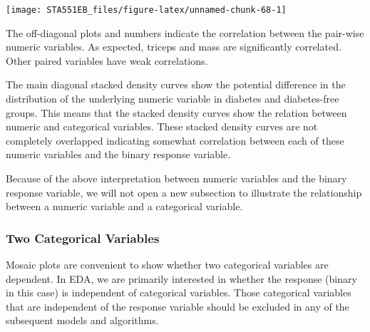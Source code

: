 \documentclass[
]{book}
\begin{document}
\begin{center}\texttt{[image: STA551EB\_files/figure-latex/unnamed-chunk-68-1]} \end{center}

The off-diagonal plots and numbers indicate the correlation between the pair-wise numeric variables. As expected, triceps and mass are significantly correlated. Other paired variables have weak correlations.

The main diagonal stacked density curves show the potential difference in the distribution of the underlying numeric variable in diabetes and diabetes-free groups. This means that the stacked density curves show the relation between numeric and categorical variables. These stacked density curves are not completely overlapped indicating somewhat correlation between each of these numeric variables and the binary response variable.

Because of the above interpretation between numeric variables and the binary response variable, we will not open a new subsection to illustrate the relationship between a numeric variable and a categorical variable.

\hfill\break

\hypertarget{two-categorical-variables}{%
\subsubsection{Two Categorical Variables}\label{two-categorical-variables}}

Mosaic plots are convenient to show whether two categorical variables are dependent. In EDA, we are primarily interested in whether the response (binary in this case) is independent of categorical variables. Those categorical variables that are independent of the response variable should be excluded in any of the subsequent models and algorithms.
\end{document}

